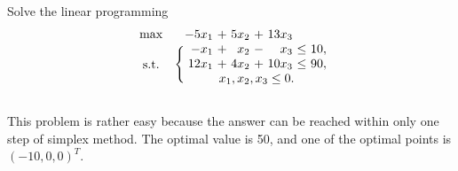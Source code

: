 \documentclass{assignment}[2019/10/15]
\begin{document}
    \begin{problem}\label{pr:3}
        Solve the linear programming
        \begin{equation}
            \begin{blockarray}{c*{3}{r@{\hspace{0.33em}}c@{\hspace{0.33em}}}l}
                \max & -5x_1 & +&5x_2 & +&13x_3\\
                \begin{block}{\BAmultirow{3em}\{*{3}{r@{\hspace{0.33em}}c@{\hspace{0.33em}}}l}
                    \centering\text{s.t.} & -x_1 & +&x_2 & -&x_3 & \leq & 10,\\
                    & 12x_1 & + &4x_2 & +& 10x_3& \leq & 90,\\
                    \begin{block*}{c\BAmulticolumn{7}{c}}
                        & x_1, x_2, x_3\leq 0.\\
                    \end{block*}
                \end{block}
            \end{blockarray}
        \end{equation}
    \end{problem}
    \begin{solution}
        This problem is rather easy because the answer can be reached within only one step of simplex method. The optimal value is 50, and one of the optimal points is $(-10, 0, 0)^T$.
    \end{solution}
\end{document}
